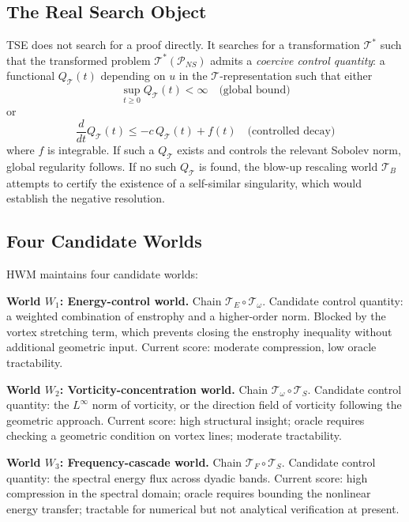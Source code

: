 \subsection{The Real Search Object}

TSE does not search for a proof directly. It searches for a transformation $\mathcal{T}^*$ such that the transformed problem $\mathcal{T}^*(\mathcal{P}_{NS})$ admits a \emph{coercive control quantity}: a functional $Q_{\mathcal{T}}(t)$ depending on $u$ in the $\mathcal{T}$-representation such that either
\[
\sup_{t \geq 0} Q_{\mathcal{T}}(t) < \infty \quad \text{(global bound)}
\]
or
\[
\frac{d}{dt} Q_{\mathcal{T}}(t) \leq -c\, Q_{\mathcal{T}}(t) + f(t) \quad \text{(controlled decay)}
\]
where $f$ is integrable. If such a $Q_{\mathcal{T}}$ exists and controls the relevant Sobolev norm, global regularity follows. If no such $Q_{\mathcal{T}}$ is found, the blow-up rescaling world $\mathcal{T}_B$ attempts to certify the existence of a self-similar singularity, which would establish the negative resolution.

\subsection{Four Candidate Worlds}

HWM maintains four candidate worlds:

\textbf{World $W_1$: Energy-control world.} Chain $\mathcal{T}_E \circ \mathcal{T}_\omega$. Candidate control quantity: a weighted combination of enstrophy and a higher-order norm. Blocked by the vortex stretching term, which prevents closing the enstrophy inequality without additional geometric input. Current score: moderate compression, low oracle tractability.

\textbf{World $W_2$: Vorticity-concentration world.} Chain $\mathcal{T}_\omega \circ \mathcal{T}_S$. Candidate control quantity: the $L^\infty$ norm of vorticity, or the direction field of vorticity following the geometric approach. Current score: high structural insight; oracle requires checking a geometric condition on vortex lines; moderate tractability.

\textbf{World $W_3$: Frequency-cascade world.} Chain $\mathcal{T}_F \circ \mathcal{T}_S$. Candidate control quantity: the spectral energy flux across dyadic bands. Current score: high compression in the spectral domain; oracle requires bounding the nonlinear energy transfer; tractable for numerical but not analytical verification at present.

